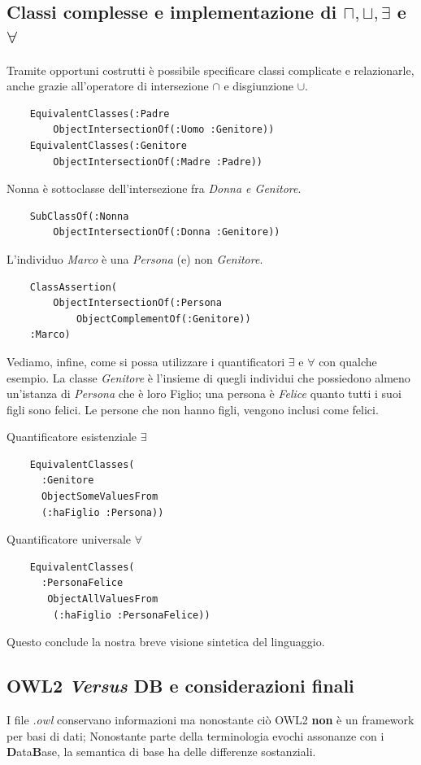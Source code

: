 \subsection{Classi complesse e implementazione di $ \sqcap,\sqcup,\exists $ e $ \forall $}
Tramite opportuni costrutti è possibile specificare classi complicate e relazionarle, 
anche grazie all'operatore di intersezione $\cap$ e disgiunzione $ \cup $.
\begin{verbatim}
	EquivalentClasses(:Padre
		ObjectIntersectionOf(:Uomo :Genitore))
	EquivalentClasses(:Genitore
		ObjectIntersectionOf(:Madre :Padre))
\end{verbatim}
Nonna è sottoclasse dell'intersezione fra \textit{Donna e Genitore}.
\begin{verbatim}
	SubClassOf(:Nonna 
		ObjectIntersectionOf(:Donna :Genitore))
\end{verbatim}
L'individuo \textit{Marco} è una \textit{Persona} (e) non \textit{Genitore}.
\begin{verbatim}
	ClassAssertion(
		ObjectIntersectionOf(:Persona 
			ObjectComplementOf(:Genitore))
	:Marco)
\end{verbatim}
Vediamo, infine, come si possa utilizzare i quantificatori $ \exists $ e $ \forall $ con qualche esempio.
La classe \textit{Genitore} è l'insieme di quegli individui che possiedono almeno un'istanza 
di \textit{Persona} che è loro Figlio; una persona è \textit{Felice} quanto tutti 
i suoi figli sono felici. Le persone che non hanno figli, vengono inclusi come felici.
\begin{multicols}{2}
	Quantificatore esistenziale $ \exists $
	\begin{verbatim}
	EquivalentClasses(
	  :Genitore
	  ObjectSomeValuesFrom
	  (:haFiglio :Persona))
	\end{verbatim}
	
	Quantificatore universale $ \forall $
	\begin{verbatim}
	EquivalentClasses(
	  :PersonaFelice
	   ObjectAllValuesFrom
	    (:haFiglio :PersonaFelice))
	\end{verbatim}
\end{multicols}

Questo conclude la nostra breve visione sintetica del linguaggio.

\subsection{OWL2 \emph{Versus} DB e considerazioni finali}
I file \textit{.owl} conservano informazioni ma nonostante ciò OWL2 \textbf{non} è un framework
per basi di dati; Nonostante parte della terminologia evochi assonanze con i \textbf{D}ata\textbf{B}ase, 
la semantica di base ha delle differenze sostanziali.

